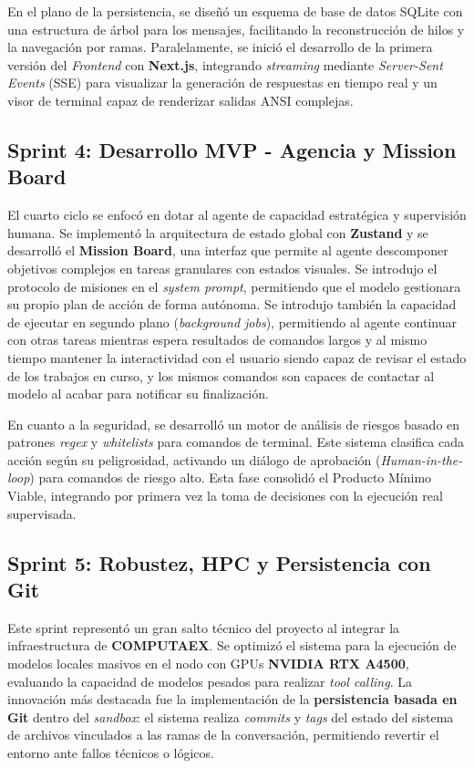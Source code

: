 En el plano de la persistencia, se diseñó un esquema de base de datos SQLite con una estructura de árbol para los mensajes, facilitando la reconstrucción de hilos y la navegación por ramas. Paralelamente, se inició el desarrollo de la primera versión del \textit{Frontend} con \textbf{Next.js}, integrando \textit{streaming} mediante \textit{Server-Sent Events} (SSE) para visualizar la generación de respuestas en tiempo real y un visor de terminal capaz de renderizar salidas ANSI complejas.

\subsection*{Sprint 4: Desarrollo MVP - Agencia y Mission Board}

El cuarto ciclo se enfocó en dotar al agente de capacidad estratégica y supervisión humana. Se implementó la arquitectura de estado global con \textbf{Zustand} y se desarrolló el \textbf{Mission Board}, una interfaz que permite al agente descomponer objetivos complejos en tareas granulares con estados visuales. Se introdujo el protocolo de misiones en el \textit{system prompt}, permitiendo que el modelo gestionara su propio plan de acción de forma autónoma. Se introdujo también la capacidad de ejecutar en segundo plano (\textit{background jobs}), permitiendo al agente continuar con otras tareas mientras espera resultados de comandos largos y al mismo tiempo mantener la interactividad con el usuario siendo capaz de revisar el estado de los trabajos en curso, y los mismos comandos son capaces de contactar al modelo al acabar para notificar su finalización.

En cuanto a la seguridad, se desarrolló un motor de análisis de riesgos basado en patrones \textit{regex} y \textit{whitelists} para comandos de terminal. Este sistema clasifica cada acción según su peligrosidad, activando un diálogo de aprobación (\textit{Human-in-the-loop}) para comandos de riesgo alto. Esta fase consolidó el Producto Mínimo Viable, integrando por primera vez la toma de decisiones con la ejecución real supervisada.

\subsection*{Sprint 5: Robustez, HPC y Persistencia con Git}

Este sprint representó un gran salto técnico del proyecto al integrar la infraestructura de \textbf{COMPUTAEX}. Se optimizó el sistema para la ejecución de modelos locales masivos en el nodo con GPUs \textbf{NVIDIA RTX A4500}, evaluando la capacidad de modelos pesados para realizar \textit{tool calling}. La innovación más destacada fue la implementación de la \textbf{persistencia basada en Git} dentro del \textit{sandbox}: el sistema realiza \textit{commits} y \textit{tags} del estado del sistema de archivos vinculados a las ramas de la conversación, permitiendo revertir el entorno ante fallos técnicos o lógicos.

